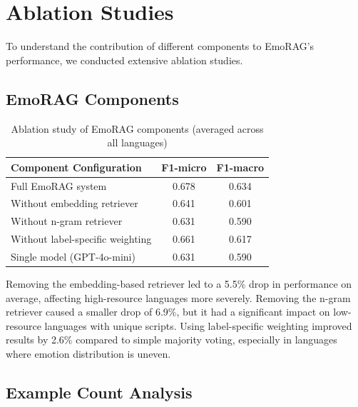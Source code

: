 \documentclass[a4paper,12pt]{extarticle}
\begin{document}
\section{Ablation Studies}

To understand the contribution of different components to EmoRAG's performance, we conducted extensive ablation studies.

\subsection{EmoRAG Components}

\begin{table}[h]
\centering
\begin{tabular}{lcc}
\toprule
\textbf{Component Configuration} & \textbf{F1-micro} & \textbf{F1-macro} \\
\midrule
Full EmoRAG system & 0.678 & 0.634 \\
Without embedding retriever & 0.641 & 0.601 \\
Without n-gram retriever & 0.631 & 0.590 \\
Without label-specific weighting & 0.661 & 0.617 \\
Single model (GPT-4o-mini) & 0.631 & 0.590 \\
\bottomrule
\end{tabular}
\caption{Ablation study of EmoRAG components (averaged across all languages)}
\label{tab:ablation_components}
\end{table}

Removing the embedding-based retriever led to a 5.5\% drop in performance on average, affecting high-resource languages more severely. Removing the n-gram retriever caused a smaller drop of 6.9\%, but it had a significant impact on low-resource languages with unique scripts. Using label-specific weighting improved results by 2.6\% compared to simple majority voting, especially in languages where emotion distribution is uneven.

\subsection{Example Count Analysis}

\end{document}
